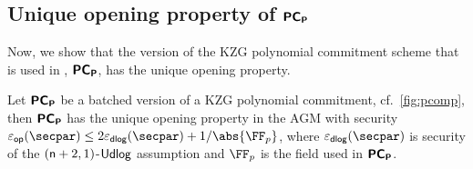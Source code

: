 \subsection{Unique opening property of $\bm{\mathsf{PC}}_{\bm{\mathsf{P}}}$}
Now, we show that the version of the KZG polynomial
commitment scheme that is used in \plonk{}, $\bm{\mathsf{PC}}_{\bm{\mathsf{P}}}$, has the unique opening
property.

\begin{lemma}
\label{lem:pcomp_op}
Let $\bm{\mathsf{PC}}_{\bm{\mathsf{P}}}$ be a batched version of a KZG polynomial commitment,
cf.~\cref{fig:pcomp}, then $\bm{\mathsf{PC}}_{\bm{\mathsf{P}}}$ has the unique opening property  
 in the AGM with security
$\epsop(\secpar) \leq 2 \epsdlog(\secpar) + \infrac{1}{\abs{\FF_p}}$, where
$\epsdlog(\secpar)$ is security of the $(\mathsf{n} + 2, 1)$-$\mathsf{Udlog}$ assumption and
$\FF_p$ is the field used in $\bm{\mathsf{PC}}_{\bm{\mathsf{P}}}$.\end{lemma}
